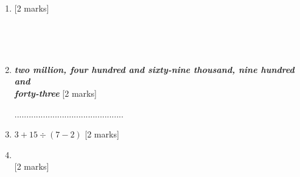 \documentclass{article}
\begin{document}
\begin{enumerate}
    


\item \quad {}   \hspace{2cm} [2 marks]
 \par
 \vspace{20pt}

\noindent \dotuline{\hspace{17cm}} \\
\par
\noindent \dotuline{\hspace{17cm}} \\
\vspace{10pt}
\hline
\vspace{10pt}

\item \quad {} \textit{\textbf{two million, four hundred and sixty-nine thousand, nine hundred and }} \\
\textit{\textbf{forty-three}}  \hspace{2cm} [2 marks]

 
 \par
 \vspace{60pt}
 ..............................................

 \vspace{20pt}
 \hline
 \vspace{10pt}

\item \quad \( 3 + 15 \div (7 - 2 ) \) \hspace{2cm} [2 marks]
\vspace{80pt}
\hline
\vspace{10pt}



\item \quad {} \\ 
\quad {} \hspace{2cm} [2 marks]
\vspace{100pt}
\hline
\vspace{5pt}


\end{enumerate}
\end{document}
